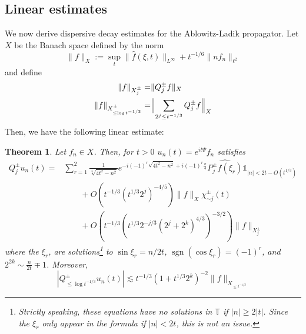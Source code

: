 \documentclass[letterpaper, reqno,final]{amsart}
\DeclareMathOperator{\sgn}{sgn}
\newcommand{\bbT}{\mathbb{T}}
\newcommand{\bbOne}{\mathds{1}}
\newcommand{\discrAvg}{\Psi}
\newcommand{\linProp}[1][t]{e^{i#1\discrAvg}}
\newtheorem{thm}{Theorem}
\begin{document}
\subsection{Linear estimates}
We now derive dispersive decay estimates for the Ablowitz-Ladik propagator.  Let $X$ be the Banach space defined by the norm
\begin{equation*}
    \lVert f \rVert_X := \sup_{t} \lVert \hat{f}(\xi,t) \rVert_{L^\infty} + t^{-1/6} \lVert n f_n \rVert_{\ell^2}
\end{equation*}
and define 
\begin{equation*}\begin{split}
    \lVert f \rVert_{X_j^\pm} =& \lVert Q_j^\pm f \rVert_{X}\\
    \lVert f \rVert_{X_{\leq \log t^{-1/3}}^\pm} =& \Bigl\lVert \sum_{2^j \leq t^{-1/3}} Q_{j}^\pm f \Bigr\rVert_{X}\\
\end{split}\end{equation*}    
Then, we have the following linear estimate:
\begin{thm}\label{thm:lin-decay-al}
    Let $f_n \in X$.  Then, for $t > 0$ $u_n(t) = \linProp f_n$ satisfies
    \begin{equation}\begin{split}\label{eqn:refined-linear-est}
        Q_{j}^{\pm} u_n(t) =& \sum_{r = 1}^2\frac{1}{\sqrt[4]{4t^2 - n^2}} e^{-i(-1)^r\sqrt{4t^2 - n^2}+i(-1)^r\frac{\pi}{4}} \hat{P_j^\pm f(\xi_r)} \bbOne_{|n| < 2t - O(t^{1/3})}\\
        &\qquad+ O(t^{-1/3} (t^{1/3} 2^j)^{-4/5})\lVert f \rVert_{X}\chi_{\sim j}^\pm(t)\\
        &\qquad+ O\left(t^{-1/3} \left(t^{1/3}2^{-j/3} (2^j + 2^{k})^{4/3}\right)^{-3/2} \right)\lVert f \rVert_{X_j^\pm}
    \end{split}\end{equation}
    where the $\xi_r$, are solutions\footnote{Strictly speaking, these equations have no solutions in $\bbT$ if $|n| \geq 2|t|$. Since the $\xi_r$ only appear in the formula if $|n| < 2t$, this is not an issue.} to $\sin \xi_r = n/2t$, $\sgn(\cos \xi_r) = (-1)^r$, and $2^{2k} \sim \frac{n}{2t} \mp 1$.   Moreover,
    \begin{equation}\label{eqn:low-freq-est}
        |Q_{\leq \log t^{-1/3}}^{\pm} u_n(t)| \lesssim t^{-1/3}(1 + t^{1/3} 2^{k})^{-2} \lVert f \rVert_{X_{\leq t^{-1/3}}}
    \end{equation}
\end{thm}
\end{document}
